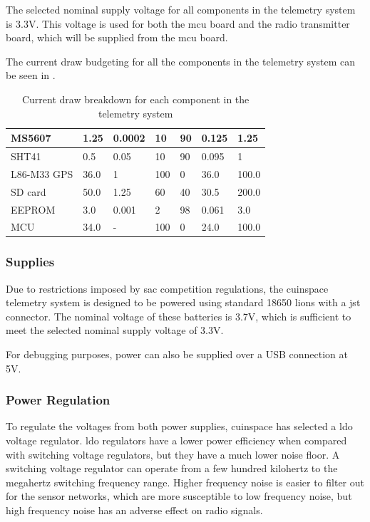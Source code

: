 The selected nominal supply voltage for all components in the telemetry system is 3.3V. This voltage is used for both
the \gls{mcu} board and the radio transmitter board, which will be supplied from the \gls{mcu} board.

The current draw budgeting for all the components in the telemetry system can be seen in .

\begin{table}[H]
    \centering
    \caption{Current draw breakdown for each component in the telemetry system}
    \label{tbl:draw}
    \begin{tabular}{p{0.8in} p{0.5in} p{0.5in} p{0.5in} p{0.5in} p{0.5in} p{0.5in}}
        \hline
        MS5607      & 1.25 & 0.0002 & 10  & 90 & 0.125 & 1.25  \\
        \hline
        SHT41       & 0.5  & 0.05   & 10  & 90 & 0.095 & 1     \\
        \hline
        L86-M33 GPS & 36.0 & 1      & 100 & 0  & 36.0  & 100.0 \\
        \hline
        SD card     & 50.0 & 1.25   & 60  & 40 & 30.5  & 200.0 \\
        \hline
        EEPROM      & 3.0  & 0.001  & 2   & 98 & 0.061 & 3.0   \\
        \hline
        MCU         & 34.0 & -      & 100 & 0  & 24.0  & 100.0 \\
        \bottomrule
    \end{tabular}
\end{table}

\subsubsection{Supplies}

Due to restrictions imposed by \gls{sac} competition regulations, the \gls{cuinspace} telemetry system is designed to
be powered using standard 18650 \glspl{lion} with a \gls{jst} connector. The nominal voltage of these batteries is
3.7V, which is sufficient to meet the selected nominal supply voltage of 3.3V.

For debugging purposes, power can also be supplied over a USB connection at 5V.

\subsubsection{Power Regulation}

To regulate the voltages from both power supplies, \gls{cuinspace} has selected a \gls{ldo} voltage regulator.
\Gls{ldo} regulators have a lower power efficiency when compared with switching voltage regulators, but they have a
much lower noise floor. A switching voltage regulator can operate from a few hundred kilohertz to the megahertz
switching frequency range. Higher frequency noise is easier to filter out for the sensor networks, which are more
susceptible to low frequency noise, but high frequency noise has an adverse effect on radio signals.

